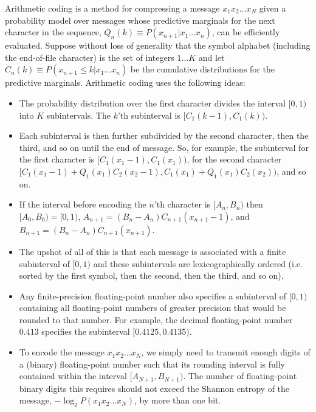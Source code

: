 \documentclass[english]{article}
\begin{document}
Arithmetic coding is a method for compressing a message $x_1 x_2 \ldots x_N$
given a probability model over messages whose predictive marginals for the next character in the sequence, $Q_n(k) \equiv P(x_{n+1}|x_1 \ldots x_n)$,
can be efficiently evaluated.
Suppose without loss of generality that the symbol alphabet (including the end-of-file character) is the set of integers $1 \ldots K$
and let $C_n(k) \equiv P(x_{n+1} \leq k | x_1 \ldots x_n)$ be the cumulative distributions for the predictive marginals.
Arithmetic coding uses the following ideas:
\begin{itemize}
\item The probability distribution over the first character divides the interval $[0,1)$ into $K$ subintervals.
  The $k$'th subinterval is $[C_1(k-1),C_1(k))$.
  \item Each subinterval is then further subdivided by the second character, then the third, and so on until the end of message.
    So, for example, the subinterval for the first character is $[C_1(x_1-1),C_1(x_1))$,
      for the second character $[C_1(x_1-1) + Q_1(x_1) C_2(x_2-1),C_1(x_1) + Q_1(x_1) C_2(x_2))$,
          and so on.
        \item If the interval before encoding the $n$'th character is $[A_n,B_n)$ then
          $[A_0,B_0) = [0,1)$,
              $A_{n+1} = (B_n-A_n) C_{n+1}(x_{n+1}-1)$,
              and $B_{n+1} = (B_n-A_n) C_{n+1}(x_{n+1})$.
            \item The upshot of all of this is that each message is associated with a finite subinterval of $[0,1)$
              and these subintervals are lexicographically ordered (i.e. sorted by the first symbol, then the second, then the third, and so on).
            \item Any finite-precision floating-point number also specifies a subinterval of $[0,1)$
              containing all floating-point numbers of greater precision that would be rounded to that number.
              For example, the decimal floating-point number $0.413$ specifies the subinterval $[0.4125,0.4135)$.
              \item To encode the message $x_1 x_2 \ldots x_N$,
                we simply need to transmit enough digits of a (binary) floating-point number such that its
                rounding interval is fully contained within the interval $[A_{N+1},B_{N+1})$.
                  The number of floating-point binary digits this requires should not exceed the Shannon entropy of the message,
                  $-\log_2 P(x_1 x_2 \ldots x_N)$, by more than one bit.
\end{itemize}
\end{document}

